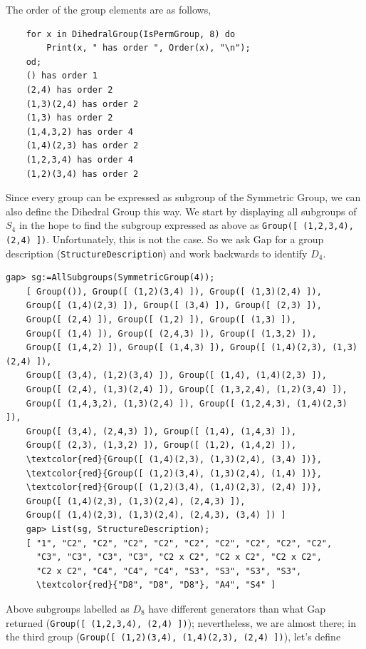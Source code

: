The order of the group elements are as follows,

\begin{verbatim}
    for x in DihedralGroup(IsPermGroup, 8) do
        Print(x, " has order ", Order(x), "\n");
    od;
    () has order 1
    (2,4) has order 2
    (1,3)(2,4) has order 2
    (1,3) has order 2
    (1,4,3,2) has order 4
    (1,4)(2,3) has order 2
    (1,2,3,4) has order 4
    (1,2)(3,4) has order 2
\end{verbatim}

Since every group can be expressed as subgroup of the Symmetric Group, we can also define the Dihedral Group this way. We start by displaying all subgroups of $S_4$ in the hope to find the subgroup expressed as above as 
\verb+Group([ (1,2,3,4), (2,4) ])+. Unfortunately, this is not the case. So we ask Gap for a group description
(\verb+StructureDescription+) and work backwards to identify $D_4$.

\begin{Verbatim}[commandchars=\\\{\}]
    gap> sg:=AllSubgroups(SymmetricGroup(4));
    [ Group(()), Group([ (1,2)(3,4) ]), Group([ (1,3)(2,4) ]), 
    Group([ (1,4)(2,3) ]), Group([ (3,4) ]), Group([ (2,3) ]), 
    Group([ (2,4) ]), Group([ (1,2) ]), Group([ (1,3) ]), 
    Group([ (1,4) ]), Group([ (2,4,3) ]), Group([ (1,3,2) ]), 
    Group([ (1,4,2) ]), Group([ (1,4,3) ]), Group([ (1,4)(2,3), (1,3)(2,4) ]),
    Group([ (3,4), (1,2)(3,4) ]), Group([ (1,4), (1,4)(2,3) ]), 
    Group([ (2,4), (1,3)(2,4) ]), Group([ (1,3,2,4), (1,2)(3,4) ]),
    Group([ (1,4,3,2), (1,3)(2,4) ]), Group([ (1,2,4,3), (1,4)(2,3) ]), 
    Group([ (3,4), (2,4,3) ]), Group([ (1,4), (1,4,3) ]), 
    Group([ (2,3), (1,3,2) ]), Group([ (1,2), (1,4,2) ]), 
    \textcolor{red}{Group([ (1,4)(2,3), (1,3)(2,4), (3,4) ])},
    \textcolor{red}{Group([ (1,2)(3,4), (1,3)(2,4), (1,4) ])},
    \textcolor{red}{Group([ (1,2)(3,4), (1,4)(2,3), (2,4) ])},
    Group([ (1,4)(2,3), (1,3)(2,4), (2,4,3) ]), 
    Group([ (1,4)(2,3), (1,3)(2,4), (2,4,3), (3,4) ]) ]
    gap> List(sg, StructureDescription);
    [ "1", "C2", "C2", "C2", "C2", "C2", "C2", "C2", "C2", "C2", 
      "C3", "C3", "C3", "C3", "C2 x C2", "C2 x C2", "C2 x C2", 
      "C2 x C2", "C4", "C4", "C4", "S3", "S3", "S3", "S3", 
      \textcolor{red}{"D8", "D8", "D8"}, "A4", "S4" ]
\end{Verbatim}

Above subgroups labelled as $D_8$ have different generators than what Gap returned (\verb+Group([ (1,2,3,4), (2,4) ])+); nevertheless, we are almost there; in the third group (\verb+Group([ (1,2)(3,4), (1,4)(2,3), (2,4) ])+), let's define

